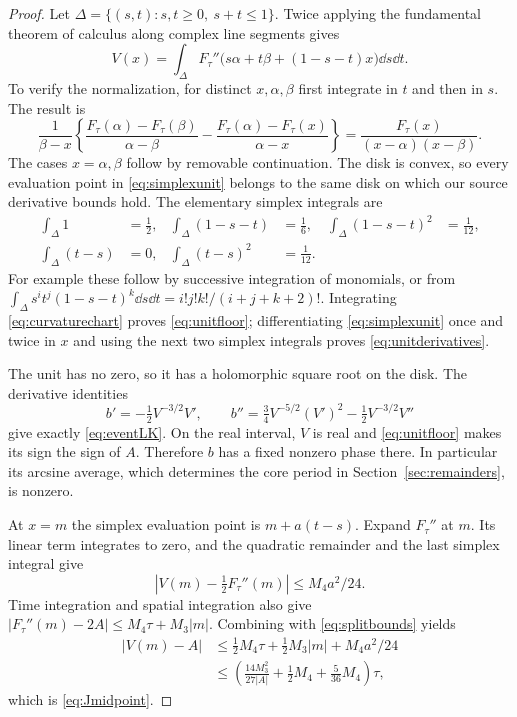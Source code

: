 \begin{proof}
Let $\Delta=\{(s,t):s,t\geq0,\ s+t\leq1\}$. Twice applying the
fundamental theorem of calculus along complex line segments gives
\begin{equation}\label{eq:simplexunit}
 V(x)=\int_\Delta
 F_\tau''\bigl(s\alpha+t\beta+(1-s-t)x\bigr)\dd s\dd t.
\end{equation}
To verify the normalization, for distinct $x,\alpha,\beta$ first
integrate in $t$ and then in $s$. The result is
\[
 \frac1{\beta-x}
 \left\{\frac{F_\tau(\alpha)-F_\tau(\beta)}{\alpha-\beta}
       -\frac{F_\tau(\alpha)-F_\tau(x)}{\alpha-x}\right\}
 =\frac{F_\tau(x)}{(x-\alpha)(x-\beta)}.
\]
The cases $x=\alpha,\beta$ follow by removable continuation.
The disk is convex, so every evaluation point in
\eqref{eq:simplexunit} belongs to the same disk on which our source
derivative bounds hold. The elementary simplex integrals are
\begin{align*}
 \int_\Delta1&=\tfrac12,&
 \int_\Delta(1-s-t)&=\tfrac16,&
 \int_\Delta(1-s-t)^2&=\tfrac1{12},\\
 \int_\Delta(t-s)&=0,&
 \int_\Delta(t-s)^2&=\tfrac1{12}.&&
\end{align*}
For example these follow by successive integration of monomials, or
from $\int_\Delta s^it^j(1-s-t)^k\dd s\dd t
=i!j!k!/(i+j+k+2)!$. Integrating
\eqref{eq:curvaturechart} proves \eqref{eq:unitfloor}; differentiating
\eqref{eq:simplexunit} once and twice in $x$ and using the next two
simplex integrals proves \eqref{eq:unitderivatives}.

The unit has no zero, so it has a holomorphic square root on the disk.
The derivative identities
\[
 b'=-\tfrac12V^{-3/2}V',\qquad
 b''=\tfrac34V^{-5/2}(V')^2-\tfrac12V^{-3/2}V''
\]
give exactly \eqref{eq:eventLK}. On the real interval, $V$ is real
and \eqref{eq:unitfloor} makes its sign the sign of $A$. Therefore
$b$ has a fixed nonzero phase there. In particular its arcsine average,
which determines the core period in Section~\ref{sec:remainders},
is nonzero.

At $x=m$ the simplex evaluation point is $m+a(t-s)$. Expand
$F_\tau''$ at $m$. Its linear term integrates to zero, and the
quadratic remainder and the last simplex integral give
\[
 |V(m)-\tfrac12F_\tau''(m)|\leq M_4a^2/24.
\]
Time integration and spatial integration also give
$|F_\tau''(m)-2A|\leq M_4\tau+M_3|m|$. Combining with
\eqref{eq:splitbounds} yields
\begin{align*}
 |V(m)-A|
 &\leq\tfrac12M_4\tau+\tfrac12M_3|m|+M_4a^2/24\\
 &\leq\left(\frac{14M_3^2}{27|A|}
            +\frac12M_4+\frac5{36}M_4\right)\tau,
\end{align*}
which is \eqref{eq:Jmidpoint}.
\end{proof}

